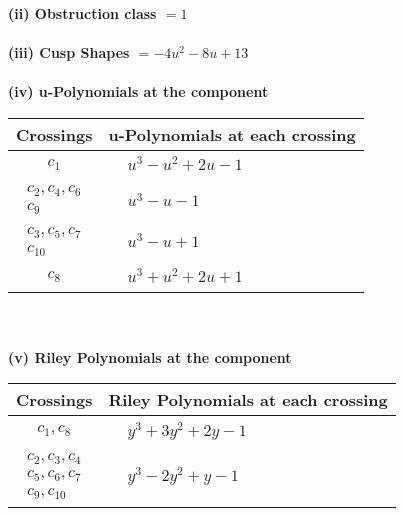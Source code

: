 \documentclass[1p]{elsarticle_modified}
\theoremstyle{definition}
\begin{document}
\flushleft \textbf{(ii) Obstruction class $= 1$}\\~\\
\flushleft \textbf{(iii) Cusp Shapes $= -4 u^2-8 u+13$}\\~\\
\newpage\renewcommand{\arraystretch}{1}
\flushleft \textbf{(iv) u-Polynomials at the component}\newline \\
\begin{tabular}{m{50pt}|m{274pt}}
Crossings & \hspace{64pt}u-Polynomials at each crossing \\
\hline $$\begin{aligned}c_{1}\end{aligned}$$&$\begin{aligned}
&u^3- u^2+2 u-1
\end{aligned}$\\
\hline $$\begin{aligned}c_{2},c_{4},c_{6}\\c_{9}\end{aligned}$$&$\begin{aligned}
&u^3- u-1
\end{aligned}$\\
\hline $$\begin{aligned}c_{3},c_{5},c_{7}\\c_{10}\end{aligned}$$&$\begin{aligned}
&u^3- u+1
\end{aligned}$\\
\hline $$\begin{aligned}c_{8}\end{aligned}$$&$\begin{aligned}
&u^3+u^2+2 u+1
\end{aligned}$\\
\hline
\end{tabular}\\~\\
\newpage\renewcommand{\arraystretch}{1}
\flushleft \textbf{(v) Riley Polynomials at the component}\newline \\
\begin{tabular}{m{50pt}|m{274pt}}
Crossings & \hspace{64pt}Riley Polynomials at each crossing \\
\hline $$\begin{aligned}c_{1},c_{8}\end{aligned}$$&$\begin{aligned}
&y^3+3 y^2+2 y-1
\end{aligned}$\\
\hline $$\begin{aligned}c_{2},c_{3},c_{4}\\c_{5},c_{6},c_{7}\\c_{9},c_{10}\end{aligned}$$&$\begin{aligned}
&y^3-2 y^2+y-1
\end{aligned}$\\
\hline
\end{tabular}\\~\\
\end{document}
